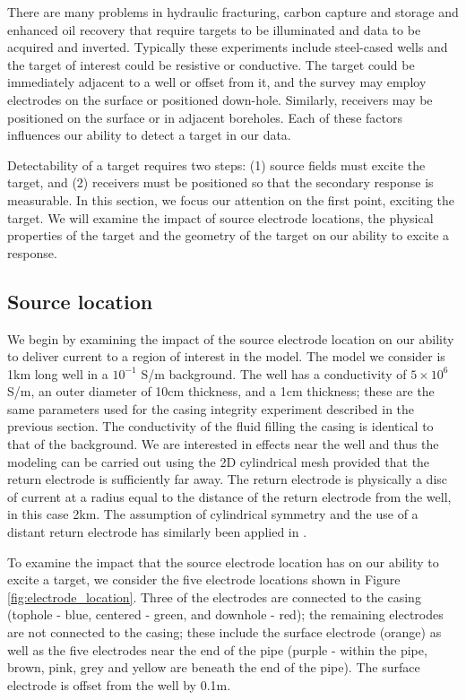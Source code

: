 There are many problems in hydraulic fracturing, carbon capture and storage and enhanced oil recovery that require targets to be illuminated and data to be acquired and inverted. Typically these experiments include steel-cased wells and the target of interest could be resistive or conductive. The target could be immediately adjacent to a well or offset from it, and the survey may employ electrodes on the surface or positioned down-hole. Similarly, receivers may be positioned on the surface or in adjacent boreholes. Each of these factors influences our ability to detect a target in our data.

Detectability of a target requires two steps: (1) source fields must excite the target, and (2) receivers must be positioned so that the secondary response is measurable. In this section, we focus our attention on the first point, exciting the target. We will examine the impact of source electrode locations, the physical properties of the target and the geometry of the target on our ability to excite a response.
\subsection{Source location}
We begin by examining the impact of the source electrode location on our ability to deliver current to a region of interest in the model. The model we consider is 1km long well in a $10^{-1}$ S/m background. The well has a conductivity of $5 \times 10^6$ S/m, an outer diameter of 10cm thickness, and a 1cm thickness; these are the same parameters used for the casing integrity experiment described in the previous section. The conductivity of the fluid filling the casing is identical to that of the background. We are interested in effects near the well and thus the modeling can be carried out using the 2D cylindrical mesh provided that the return electrode is sufficiently far away. The return electrode is physically a disc of current at a radius equal to the distance of the return electrode from the well, in this case 2km. The assumption of cylindrical symmetry and the use of a distant return electrode has similarly been applied in \cite{Schenkel1991}.

To examine the impact that the source electrode location has on our ability to excite a target, we consider the five electrode locations shown in Figure \ref{fig:electrode_location}. Three of the electrodes are connected to the casing (tophole - blue, centered - green, and downhole - red); the remaining electrodes are  not connected to the casing; these include the surface electrode (orange) as well as the five electrodes near the end of the pipe (purple - within the pipe, brown, pink, grey and yellow are beneath the end of the pipe). The surface electrode is offset from the well by 0.1m.



